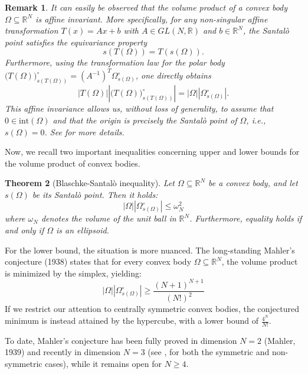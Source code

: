 \documentclass[10pt,a4paper]{amsart}
\newtheorem{theorem}{Theorem}[section]
\newtheorem{remark}[theorem]{Remark}
\numberwithin{equation}{section}
\begin{document}
\noindent \begin{remark}\label{r:affine-invariance}
    It can easily be observed that the volume product of a convex body $\Omega \subseteq \mathbb{R}^N$ is affine invariant. More specifically, for any non-singular affine transformation $T(x) = Ax + b$ with $A \in GL(N, \mathbb{R})$ and $b \in \mathbb{R}^N$, the Santalò point satisfies the equivariance property
\[
s(T(\Omega)) = T(s(\Omega)).
\]
Furthermore, using the transformation law for the polar body $\big(T(\Omega)\big)_{s(T(\Omega))}^\circ = (A^{-1})^T \Omega_{s(\Omega)}^\circ$, one directly obtains
\[
|T(\Omega)| \left|\big(T(\Omega)\big)_{s(T(\Omega))}^\circ\right| = |\Omega| |\Omega_{s(\Omega)}^\circ|.
\]
This affine invariance allows us, without loss of generality, to assume that $0 \in \text{int}(\Omega)$ and that the origin is precisely the Santalò point of $\Omega$, i.e., $s(\Omega) = 0$.
See \cite{schneider2014} for more details.
     \end{remark} 
\noindent Now, we recall two important inequalities concerning upper and lower bounds for the volume product of convex bodies.

\begin{theorem}[Blaschke-Santalò inequality]
    Let $\Omega \subseteq\mathbb{R}^N$ be a convex body, and let $s(\Omega)$ be its Santalò point. Then it holds:
    \begin{equation}
    |\Omega||\Omega^\circ_{s(\Omega)}| \leq \omega_N^2
    \end{equation}
    where $\omega_N$ denotes the volume of the unit ball in $\mathbb{R}^N$. Furthermore, equality holds if and only if $\Omega$ is an ellipsoid.
\end{theorem}

\noindent For the lower bound, the situation is more nuanced. The long-standing Mahler's conjecture (1938) states that for every convex body $\Omega \subseteq \mathbb{R}^N$, the volume product is minimized by the simplex, yielding:
    \begin{equation}
    |\Omega||\Omega^\circ_{s(\Omega)}| \geq \frac{(N+1)^{N+1}}{(N!)^2}
    \end{equation}
If we restrict our attention to centrally symmetric convex bodies, the conjectured minimum is instead attained by the hypercube, with a lower bound of $\frac{4^N}{N!}$. 

\noindent To date, Mahler's conjecture has been fully proved in dimension $N=2$ (Mahler, 1939) and recently in dimension $N=3$ (see \cite{chen2026mahler}, for both the symmetric and non-symmetric cases), while it remains open for $N \geq 4$.
\end{document}

